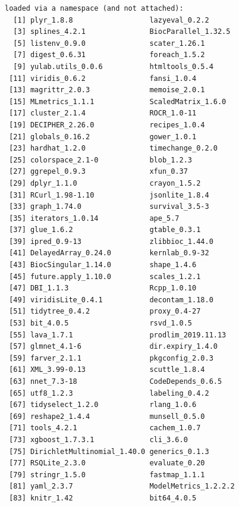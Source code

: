 \documentclass[
]{book}
\begin{document}
\begin{verbatim}
loaded via a namespace (and not attached):
  [1] plyr_1.8.8                  lazyeval_0.2.2             
  [3] splines_4.2.1               BiocParallel_1.32.5        
  [5] listenv_0.9.0               scater_1.26.1              
  [7] digest_0.6.31               foreach_1.5.2              
  [9] yulab.utils_0.0.6           htmltools_0.5.4            
 [11] viridis_0.6.2               fansi_1.0.4                
 [13] magrittr_2.0.3              memoise_2.0.1              
 [15] MLmetrics_1.1.1             ScaledMatrix_1.6.0         
 [17] cluster_2.1.4               ROCR_1.0-11                
 [19] DECIPHER_2.26.0             recipes_1.0.4              
 [21] globals_0.16.2              gower_1.0.1                
 [23] hardhat_1.2.0               timechange_0.2.0           
 [25] colorspace_2.1-0            blob_1.2.3                 
 [27] ggrepel_0.9.3               xfun_0.37                  
 [29] dplyr_1.1.0                 crayon_1.5.2               
 [31] RCurl_1.98-1.10             jsonlite_1.8.4             
 [33] graph_1.74.0                survival_3.5-3             
 [35] iterators_1.0.14            ape_5.7                    
 [37] glue_1.6.2                  gtable_0.3.1               
 [39] ipred_0.9-13                zlibbioc_1.44.0            
 [41] DelayedArray_0.24.0         kernlab_0.9-32             
 [43] BiocSingular_1.14.0         shape_1.4.6                
 [45] future.apply_1.10.0         scales_1.2.1               
 [47] DBI_1.1.3                   Rcpp_1.0.10                
 [49] viridisLite_0.4.1           decontam_1.18.0            
 [51] tidytree_0.4.2              proxy_0.4-27               
 [53] bit_4.0.5                   rsvd_1.0.5                 
 [55] lava_1.7.1                  prodlim_2019.11.13         
 [57] glmnet_4.1-6                dir.expiry_1.4.0           
 [59] farver_2.1.1                pkgconfig_2.0.3            
 [61] XML_3.99-0.13               scuttle_1.8.4              
 [63] nnet_7.3-18                 CodeDepends_0.6.5          
 [65] utf8_1.2.3                  labeling_0.4.2             
 [67] tidyselect_1.2.0            rlang_1.0.6                
 [69] reshape2_1.4.4              munsell_0.5.0              
 [71] tools_4.2.1                 cachem_1.0.7               
 [73] xgboost_1.7.3.1             cli_3.6.0                  
 [75] DirichletMultinomial_1.40.0 generics_0.1.3             
 [77] RSQLite_2.3.0               evaluate_0.20              
 [79] stringr_1.5.0               fastmap_1.1.1              
 [81] yaml_2.3.7                  ModelMetrics_1.2.2.2       
 [83] knitr_1.42                  bit64_4.0.5                

\end{verbatim}
\end{document}
